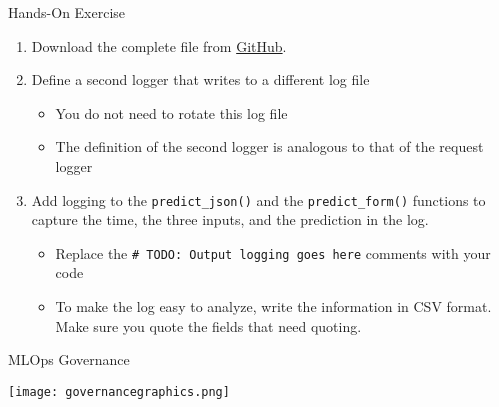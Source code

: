 \documentclass[ignorenonframetext,xcolor=x11names]{beamer}
\begin{document}
\begin{frame}{Hands-On Exercise}
\begin{enumerate}
\item Download the complete file from \href{https://github.com/jevermann/busi4720-mlops/blob/main/flask_deploy_logging.py}{GitHub}. \\
\item Define a second logger that writes to a different log file
\begin{itemize}
  \item You do not need to rotate this log file
  \item The definition of the second logger is analogous to that of the request logger
\end{itemize}
\item Add logging to the \texttt{predict\_json()} and the \texttt{predict\_form()} functions to capture the time, the three inputs, and the prediction in the log.
\begin{itemize}
   \item Replace the \texttt{\# TODO: Output logging goes here} comments with your code
   \item To make the log easy to analyze, write the information in CSV format. Make sure you quote the fields that need quoting.
\end{itemize}
\end{enumerate}
\end{frame}

\begin{frame}{MLOps Governance}
\centering

\texttt{[image: governancegraphics.png]}
\end{frame}
\end{document}
